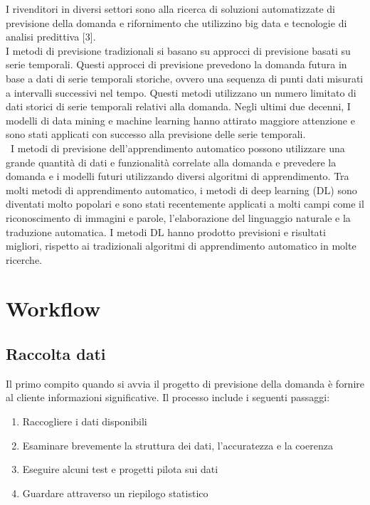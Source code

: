 \documentclass[12pt,a4paper]{report}
\begin{document}
I rivenditori in diversi settori sono alla ricerca di soluzioni automatizzate di previsione della domanda e rifornimento che utilizzino big data e tecnologie di analisi predittiva [3]. \\
I metodi di previsione tradizionali si basano su approcci di previsione basati su serie temporali. Questi approcci di previsione prevedono la domanda futura in base a dati di serie temporali storiche, ovvero una sequenza di punti dati misurati a intervalli successivi nel tempo. Questi metodi utilizzano un numero limitato di dati storici di serie temporali relativi alla domanda. Negli ultimi due decenni, I modelli di data mining e machine learning hanno attirato maggiore attenzione e sono stati applicati con successo alla previsione delle serie temporali.\\\
I metodi di previsione dell'apprendimento automatico possono utilizzare una grande quantità di dati e funzionalità correlate alla domanda e prevedere la domanda e i modelli futuri utilizzando diversi algoritmi di apprendimento. Tra molti metodi di apprendimento automatico, i metodi di deep learning (DL) sono diventati molto popolari e sono stati recentemente applicati a molti campi come il riconoscimento di immagini e parole, l'elaborazione del linguaggio naturale e la traduzione automatica.
I metodi DL hanno prodotto previsioni e risultati migliori, rispetto ai tradizionali algoritmi di apprendimento automatico in molte ricerche. 

\section{Workflow}

\subsection{Raccolta dati}
Il primo compito quando si avvia il progetto di previsione della domanda è fornire al cliente informazioni significative. Il processo include i seguenti passaggi:
\begin{enumerate}
    \item Raccogliere i dati disponibili
    \item Esaminare brevemente la struttura dei dati, l'accuratezza e la coerenza
    \item Eseguire alcuni test e progetti pilota sui dati
    \item Guardare attraverso un riepilogo statistico
\end{enumerate}
\end{document}
